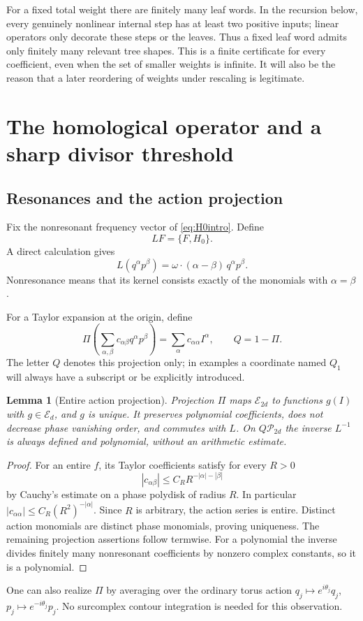 \documentclass[11pt,letterpaper]{article}
\numberwithin{equation}{section}
\newtheorem{lemma}[theorem]{Lemma}
\theoremstyle{definition}
\theoremstyle{remark}
\newcommand{\E}{\mathscr E}
\newcommand{\Pp}{\mathscr P}
\begin{document}
For a fixed total weight there are finitely many leaf words. In the
recursion below, every genuinely nonlinear internal step has at least two
positive inputs; linear operators only decorate these steps or the leaves.
Thus a fixed leaf word admits only finitely many relevant tree shapes.
This is a finite certificate for every coefficient, even when the set of
smaller weights is infinite. It will also be the reason that a later
reordering of weights under rescaling is legitimate.

\section{The homological operator and a sharp divisor threshold}
\label{sec:divisors}

\subsection{Resonances and the action projection}
Fix the nonresonant frequency vector of \eqref{eq:H0intro}. Define
\[
 L F=\{F,H_0\}.
\]
A direct calculation gives
\begin{equation}\label{eq:homological}
 L(q^\alpha p^\beta)
   =\omega\cdot(\alpha-\beta)\,q^\alpha p^\beta.
\end{equation}
Nonresonance means that its kernel consists exactly of the monomials with
$\alpha=\beta$.

For a Taylor expansion at the origin, define
\begin{equation}\label{eq:projection}
 \Pi\left(\sum_{\alpha,\beta}c_{\alpha\beta}q^\alpha p^\beta\right)
  =\sum_\alpha c_{\alpha\alpha}I^\alpha,
 \qquad Q=1-\Pi.
\end{equation}
The letter $Q$ denotes this projection only; in examples a coordinate named
$Q_1$ will always have a subscript or be explicitly introduced.

\begin{lemma}[Entire action projection]\label{lem:projection}
Projection $\Pi$ maps $\E_{2d}$ to functions $g(I)$ with $g\in\E_d$, and
$g$ is unique. It preserves polynomial coefficients, does not decrease
phase vanishing order, and commutes with $L$. On $Q\Pp_{2d}$ the inverse
$L^{-1}$ is always defined and polynomial, without an arithmetic estimate.
\end{lemma}
\begin{proof}
For an entire $f$, its Taylor coefficients satisfy for every $R>0$
\[
 |c_{\alpha\beta}|\le C_R R^{-|\alpha|-|\beta|}
\]
by Cauchy's estimate on a phase polydisk of radius $R$. In particular
$|c_{\alpha\alpha}|\le C_R(R^2)^{-|\alpha|}$. Since $R$ is arbitrary, the
action series is entire. Distinct action monomials are distinct phase
monomials, proving uniqueness. The remaining projection assertions follow
termwise. For a polynomial the inverse divides finitely many nonresonant
coefficients by nonzero complex constants, so it is a polynomial.
\end{proof}
One can also realize $\Pi$ by averaging over the ordinary torus action
$q_j\mapsto e^{i\theta_j}q_j$, $p_j\mapsto e^{-i\theta_j}p_j$. No
surcomplex contour integration is needed for this observation.
\end{document}
